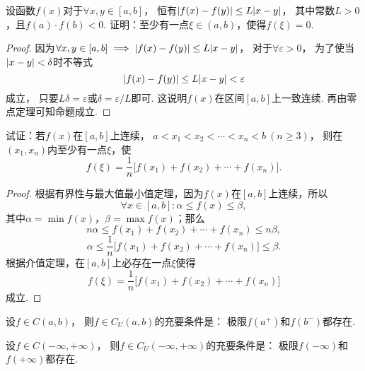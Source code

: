 \begin{example}
设函数\(f(x)\)对于\(\forall x,y \in [a,b]\)，
恒有\(\abs{f(x) - f(y)} \leq L \abs{x - y}\)，
其中常数\(L > 0\)，且\(f(a) \cdot f(b) < 0\).
证明：至少有一点\(\xi \in (a,b)\)，使得\(f(\xi) = 0\).
\begin{proof}
因为\(\forall x,y \in [a,b] \implies \abs{f(x) - f(y)} \leq L \abs{x - y}\)，
对于\(\forall \varepsilon > 0\)，
为了使当\(\abs{x - y} < \delta\)时不等式\[
\abs{f(x) - f(y)} \leq L \abs{x - y} < \varepsilon
\]成立，
只要\(L \delta = \varepsilon\)或\(\delta = \varepsilon / L\)即可.
这说明\(f(x)\)在区间\([a,b]\)上一致连续.
再由零点定理可知命题成立.
\end{proof}
\end{example}

\begin{example}
试证：若\(f(x)\)在\([a,b]\)上连续，
\(a < x_1 < x_2 < \dotsb < x_n < b \ (n \geq 3)\)，
则在\((x_1,x_n)\)内至少有一点\(\xi\)，使\[
f(\xi) = \frac{1}{n} \bigl[
	f(x_1) + f(x_2) + \dotsb + f(x_n)
\bigr].
\]
\begin{proof}
根据有界性与最大值最小值定理，因为\(f(x)\)在\([a,b]\)上连续，所以\[
\forall x \in [a,b] :
	\alpha \leq f(x) \leq \beta,
\]其中\(\alpha = \min f(x)\)，\(\beta = \max f(x)\)；那么\[
n \alpha \leq f(x_1) + f(x_2) + \dotsb + f(x_n) \leq n \beta,
\]\[
\alpha \leq \frac{1}{n} \bigl[f(x_1) + f(x_2) + \dotsb + f(x_n)\bigr] \leq \beta.
\]根据介值定理，在\([a,b]\)上必存在一点\(\xi\)使得\[
f(\xi) = \frac{1}{n} \bigl[ f(x_1) + f(x_2) + \dotsb + f(x_n) \bigr]
\]成立.
\end{proof}
\end{example}

\begin{theorem}\label{theorem:极限.闭区间上连续函数的性质.开区间上的连续函数一致连续的充要条件1}
设\(f \in C(a,b)\)，
则\(f \in C_U(a,b)\)的充要条件是：
极限\(f(a^+)\)和\(f(b^-)\)都存在.
\end{theorem}

\begin{theorem}\label{theorem:极限.闭区间上连续函数的性质.开区间上的连续函数一致连续的充要条件2}
设\(f \in C(-\infty,+\infty)\)，
则\(f \in C_U(-\infty,+\infty)\)的充要条件是：
极限\(f(-\infty)\)和\(f(+\infty)\)都存在.
\end{theorem}

